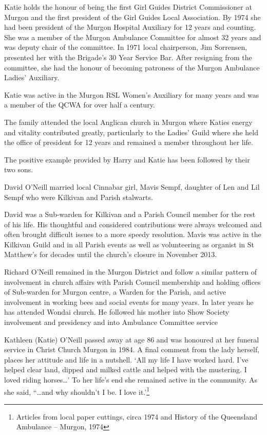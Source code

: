 Katie holds the honour of being the first Girl Guides District Commissioner at Murgon and the first president of the Girl Guides Local Association. By 1974 she had been president of the Murgon Hospital Auxiliary for 12 years and counting. She was a member of the Murgon Ambulance Committee for almost 32 years and was deputy chair of the committee. In 1971 local chairperson, Jim Sorrensen, presented her with the Brigade's 30 Year Service Bar. After resigning from the committee, she had the honour of becoming patroness of the Murgon Ambulance Ladies' Auxiliary.

Katie was active in the Murgon RSL Women's Auxiliary for many years and was a member of the QCWA for over half a century.

The family attended the local Anglican church in Murgon where Katies energy and vitality contributed greatly, particularly to the Ladies' Guild where she held the office of president for 12 years and remained a member throughout her life.

The positive example provided by Harry and Katie has been followed by their two sons.

David O'Neill married local Cinnabar girl, Mavis Sempf, daughter of Len and Lil Sempf who were Kilkivan and Parish stalwarts.

David was a Sub-warden for Kilkivan and a Parish Council member for the rest of his life. His thoughtful and considered contributions were always welcomed and often brought difficult issues to a more speedy resolution. Mavis was active in the Kilkivan Guild and in all Parish events as well as volunteering as organist in St Matthew's for decades until the church's closure in November 2013.

Richard O'Neill remained in the Murgon District and follow a similar pattern of involvement in church affairs with Parish Council membership and holding offices of Sub-warden for Murgon centre, a Warden for the Parish, and active involvement in working bees and social events for many years. In later years he has attended Wondai church. He followed his mother into Show Society involvement and presidency and into Ambulance Committee service

Kathleen (Katie) O'Neill passed away at age 86 and was honoured at her funeral service in Christ Church Murgon in 1984. A final comment from the lady herself, places her attitude and life in a nutshell. `All my life I have worked hard. I've helped clear land, dipped and milked cattle and helped with the mustering. I loved riding horses\ldots' To her life's end she remained active in the community. As she said, ``\ldots and why shouldn't I be. I love it.'\footnote{Articles from local paper cuttings, circa 1974 and History of the Queensland Ambulance -- Murgon, 1974}

